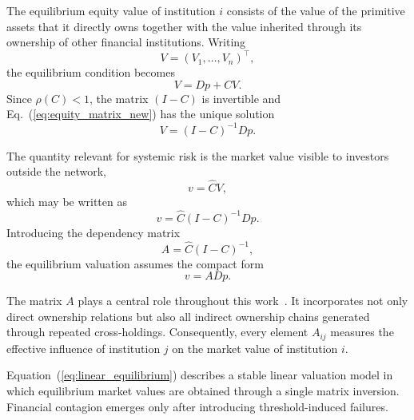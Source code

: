 \documentclass[aps,reprint,superscriptaddress,pra]{revtex4-2}
\begin{document}
The equilibrium equity value of institution $i$ consists of the value of the primitive assets that it directly owns together with the value inherited through its ownership of other financial institutions. Writing
\[
V=(V_1,\ldots,V_n)^{\top},
\]
the equilibrium condition becomes
\begin{equation}
V=Dp+CV.
\label{eq:equity_matrix_new}
\end{equation}
Since $\rho(C)<1$, the matrix $(I-C)$ is invertible and Eq.~(\ref{eq:equity_matrix_new}) has the unique solution
\begin{equation}
V=(I-C)^{-1}Dp.
\label{eq:equity_solution_new}
\end{equation}

The quantity relevant for systemic risk is the market value visible to investors outside the network,
\begin{equation}
v=\hat C V,
\end{equation}
which may be written as
\begin{equation}
v
=
\hat C(I-C)^{-1}Dp.
\end{equation}
Introducing the dependency matrix
\begin{equation}
A=\hat C(I-C)^{-1},
\label{eq:dependency_matrix}
\end{equation}
the equilibrium valuation assumes the compact form
\begin{equation}
v=ADp.
\label{eq:linear_equilibrium}
\end{equation}

The matrix $A$ plays a central role throughout this work~\cite{elliott2014financial,
acemoglu2012aggregate,
glasserman2016contagion}. It incorporates not only direct ownership relations but also all indirect ownership chains generated through repeated cross-holdings. Consequently, every element $A_{ij}$ measures the effective influence of institution $j$ on the market value of institution $i$.

Equation~(\ref{eq:linear_equilibrium}) describes a stable linear valuation model in which equilibrium market values are obtained through a single matrix inversion. Financial contagion emerges only after introducing threshold-induced failures.
\end{document}
